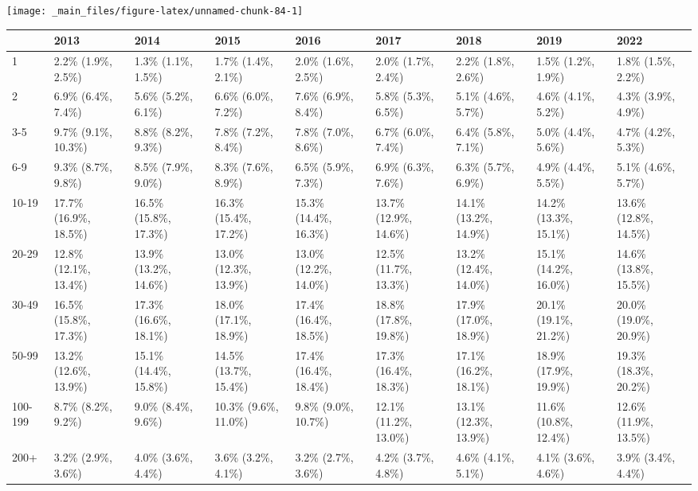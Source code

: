 \documentclass[
]{book}
\begin{document}
\texttt{[image: \_main\_files/figure-latex/unnamed-chunk-84-1]}

\begin{table}
\centering
\begin{tabular}[t]{>{}l|>{}l|>{}l|>{}l|>{}l|>{}l|>{}l|>{}l|>{}l}
\hline
  & 2013 & 2014 & 2015 & 2016 & 2017 & 2018 & 2019 & 2022\\
\hline
1 & 2.2\% (1.9\%, 2.5\%) & 1.3\% (1.1\%, 1.5\%) & 1.7\% (1.4\%, 2.1\%) & 2.0\% (1.6\%, 2.5\%) & 2.0\% (1.7\%, 2.4\%) & 2.2\% (1.8\%, 2.6\%) & 1.5\% (1.2\%, 1.9\%) & 1.8\% (1.5\%, 2.2\%)\\
\hline
2 & 6.9\% (6.4\%, 7.4\%) & 5.6\% (5.2\%, 6.1\%) & 6.6\% (6.0\%, 7.2\%) & 7.6\% (6.9\%, 8.4\%) & 5.8\% (5.3\%, 6.5\%) & 5.1\% (4.6\%, 5.7\%) & 4.6\% (4.1\%, 5.2\%) & 4.3\% (3.9\%, 4.9\%)\\
\hline
3-5 & 9.7\% (9.1\%, 10.3\%) & 8.8\% (8.2\%, 9.3\%) & 7.8\% (7.2\%, 8.4\%) & 7.8\% (7.0\%, 8.6\%) & 6.7\% (6.0\%, 7.4\%) & 6.4\% (5.8\%, 7.1\%) & 5.0\% (4.4\%, 5.6\%) & 4.7\% (4.2\%, 5.3\%)\\
\hline
6-9 & 9.3\% (8.7\%, 9.8\%) & 8.5\% (7.9\%, 9.0\%) & 8.3\% (7.6\%, 8.9\%) & 6.5\% (5.9\%, 7.3\%) & 6.9\% (6.3\%, 7.6\%) & 6.3\% (5.7\%, 6.9\%) & 4.9\% (4.4\%, 5.5\%) & 5.1\% (4.6\%, 5.7\%)\\
\hline
10-19 & 17.7\% (16.9\%, 18.5\%) & 16.5\% (15.8\%, 17.3\%) & 16.3\% (15.4\%, 17.2\%) & 15.3\% (14.4\%, 16.3\%) & 13.7\% (12.9\%, 14.6\%) & 14.1\% (13.2\%, 14.9\%) & 14.2\% (13.3\%, 15.1\%) & 13.6\% (12.8\%, 14.5\%)\\
\hline
20-29 & 12.8\% (12.1\%, 13.4\%) & 13.9\% (13.2\%, 14.6\%) & 13.0\% (12.3\%, 13.9\%) & 13.0\% (12.2\%, 14.0\%) & 12.5\% (11.7\%, 13.3\%) & 13.2\% (12.4\%, 14.0\%) & 15.1\% (14.2\%, 16.0\%) & 14.6\% (13.8\%, 15.5\%)\\
\hline
30-49 & 16.5\% (15.8\%, 17.3\%) & 17.3\% (16.6\%, 18.1\%) & 18.0\% (17.1\%, 18.9\%) & 17.4\% (16.4\%, 18.5\%) & 18.8\% (17.8\%, 19.8\%) & 17.9\% (17.0\%, 18.9\%) & 20.1\% (19.1\%, 21.2\%) & 20.0\% (19.0\%, 20.9\%)\\
\hline
50-99 & 13.2\% (12.6\%, 13.9\%) & 15.1\% (14.4\%, 15.8\%) & 14.5\% (13.7\%, 15.4\%) & 17.4\% (16.4\%, 18.4\%) & 17.3\% (16.4\%, 18.3\%) & 17.1\% (16.2\%, 18.1\%) & 18.9\% (17.9\%, 19.9\%) & 19.3\% (18.3\%, 20.2\%)\\
\hline
100-199 & 8.7\% (8.2\%, 9.2\%) & 9.0\% (8.4\%, 9.6\%) & 10.3\% (9.6\%, 11.0\%) & 9.8\% (9.0\%, 10.7\%) & 12.1\% (11.2\%, 13.0\%) & 13.1\% (12.3\%, 13.9\%) & 11.6\% (10.8\%, 12.4\%) & 12.6\% (11.9\%, 13.5\%)\\
\hline
200+ & 3.2\% (2.9\%, 3.6\%) & 4.0\% (3.6\%, 4.4\%) & 3.6\% (3.2\%, 4.1\%) & 3.2\% (2.7\%, 3.6\%) & 4.2\% (3.7\%, 4.8\%) & 4.6\% (4.1\%, 5.1\%) & 4.1\% (3.6\%, 4.6\%) & 3.9\% (3.4\%, 4.4\%)\\
\hline
\end{tabular}
\end{table}
\end{document}
